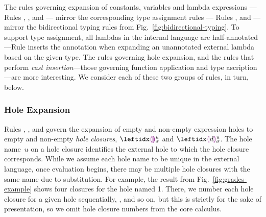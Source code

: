 The rules governing expansion of constants, variables and lambda expressions
--- Rules , ,  and 
--- mirror the corresponding type assignment rules
--- Rules ,  and 
--- mirror the bidirectional typing rules from Fig.~\ref{fig:bidirectional-typing}.
%
%
To support type assignment, all lambdas in the internal language are
half-annotated---Rule  inserts the annotation when expanding an
unannotated external lambda based on the given type.
%
The rules governing hole expansion, and the rules that perform \emph{cast insertion}---those governing
function application and type ascription---are more interesting. We consider each of these two groups of rules, in turn, below.

\subsubsection{Hole Expansion}\label{sec:hole-expansion} 
Rules , ,  and  govern the expansion of empty and non-empty expression holes to empty and non-empty \emph{hole closures}, $\dehole{u}{\sigma}{}$ and $\dhole{\dexp}{u}{\sigma}{}$. 
%
The hole name~$u$ on a hole closure identifies the external hole to which the hole closure corresponds.
%
While we assume each hole name to be unique in the external language, once evaluation begins, there may be multiple hole closures with the same name due to substitution.
%
For example, the result from Fig.~\ref{fig:grades-example} shows four closures for the hole named 1.
%
There, we number each hole closure for a given hole sequentially, ,  and so on, but this is strictly for the sake of presentation, so we omit hole closure numbers from the core calculus.

